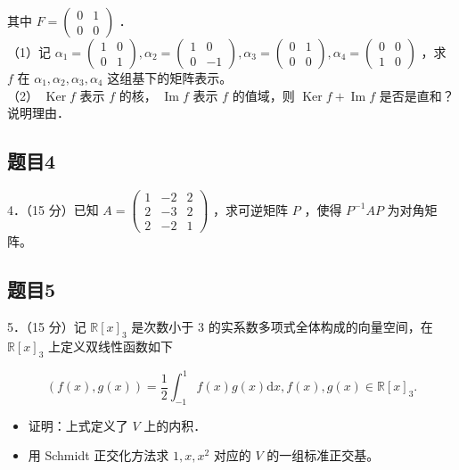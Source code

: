 \documentclass{article}
\begin{document}
其中 \(F=\left(\begin{array}{cc}0 & 1 \\ 0 & 0\end{array}\right)\) ．\\
（1）记 \(\alpha_{1}=\left(\begin{array}{ll}1 & 0 \\ 0 & 1\end{array}\right), \alpha_{2}=\left(\begin{array}{cc}1 & 0 \\ 0 & -1\end{array}\right), \alpha_{3}=\left(\begin{array}{ll}0 & 1 \\ 0 & 0\end{array}\right), \alpha_{4}=\left(\begin{array}{ll}0 & 0 \\ 1 & 0\end{array}\right)\) ，求 \(f\) 在 \(\alpha_{1}, \alpha_{2}, \alpha_{3}, \alpha_{4}\) 这组基下的矩阵表示。\\
（2） \(\operatorname{Ker} f\) 表示 \(f\) 的核， \(\operatorname{Im} f\) 表示 \(f\) 的值域，则 \(\operatorname{Ker} f+\operatorname{Im} f\) 是否是直和？说明理由．

\subsection{题目4}
4．（15 分）已知 \(A=\left(\begin{array}{lll}1 & -2 & 2 \\ 2 & -3 & 2 \\ 2 & -2 & 1\end{array}\right)\) ，求可逆矩阵 \(P\) ，使得 \(P^{-1} A P\) 为对角矩阵。

\subsection{题目5}
5．（15 分）记 \(\mathbb{R}[x]_{3}\) 是次数小于 3 的实系数多项式全体构成的向量空间，在 \(\mathbb{R}[x]_{3}\) 上定义双线性函数如下

\[
(f(x), g(x))=\frac{1}{2} \int_{-1}^{1} f(x) g(x) \mathrm{d} x, f(x), g(x) \in \mathbb{R}[x]_{3} .
\]

\begin{itemize}
  \item[（1）] 证明：上式定义了 \(V\) 上的内积．
  \item[（2）] 用 Schmidt 正交化方法求 \(1, x, x^{2}\) 对应的 \(V\) 的一组标准正交基。
\end{itemize}
\end{document}
